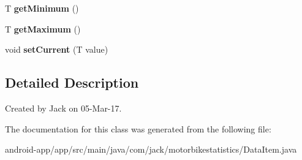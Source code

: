 \begin{DoxyCompactItemize}
\mbox{\label{classcom_1_1jack_1_1motorbikestatistics_1_1_data_item_a45cdf3ef773c9c1e69d12861deaccec0}} 
T {\bfseries get\+Minimum} ()
\item 
\mbox{\label{classcom_1_1jack_1_1motorbikestatistics_1_1_data_item_a5d58df64d90e56c7bb7e8aa8bf49aa0f}} 
T {\bfseries get\+Maximum} ()
\item 
\mbox{\label{classcom_1_1jack_1_1motorbikestatistics_1_1_data_item_abdeab9f088a2a78f66ac852993b555ca}} 
void {\bfseries set\+Current} (T value)
\end{DoxyCompactItemize}


\subsection{Detailed Description}
Created by Jack on 05-\/\+Mar-\/17. 

The documentation for this class was generated from the following file\+:\begin{DoxyCompactItemize}
\item 
android-\/app/app/src/main/java/com/jack/motorbikestatistics/Data\+Item.\+java\end{DoxyCompactItemize}
